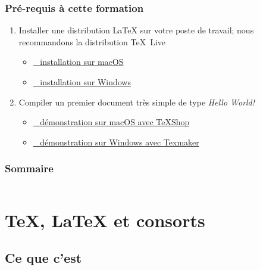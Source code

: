 \documentclass[aspectratio=54,10pt,xcolor=x11names]{beamer}
\newcommand{\capsule}[2]{\href{#1}{\faYoutubePlay~#2}}
\theoremstyle{example}
\begin{document}
\begin{frame}
  \frametitle{Pré-requis à cette formation}
  \begin{enumerate}
  \item Installer une distribution {\LaTeX} sur votre poste de
    travail; nous recommandons la distribution {\TeX}~Live
    \begin{itemize}
      \normalsize
    \item[] \capsule{https://www.youtube.com/watch?v=fjcR6lFy0c4}{%
        installation sur macOS}
    \item[] \capsule{https://www.youtube.com/watch?v=z_dq3dns-WU}{%
        installation sur Windows}
    \end{itemize}
    \bigskip
  \item Compiler un premier document très simple de type \emph{Hello World!}
    \begin{itemize}
      \normalsize
    \item[] \capsule{https://www.youtube.com/watch?v=QOUx_aOZ42o}{%
        démonstration sur macOS avec TeXShop}
    \item[] \capsule{https://www.youtube.com/watch?v=qddRMGwXnNM}{%
        démonstration sur Windows avec Texmaker}
    \end{itemize}
  \end{enumerate}
\end{frame}

\begin{frame}
  \frametitle{Sommaire}
  \small
  \begin{columns}[t]
    \begin{column}{.5\textwidth}
      \tableofcontents[sections={1-5},hideallsubsections]
    \end{column}
    \begin{column}{.5\textwidth}
      \tableofcontents[sections={6-9},hideallsubsections]
    \end{column}
  \end{columns}
\end{frame}


\section{{\TeX}, {\LaTeX} et consorts}

\subsection{Ce que c'est}
\end{document}
